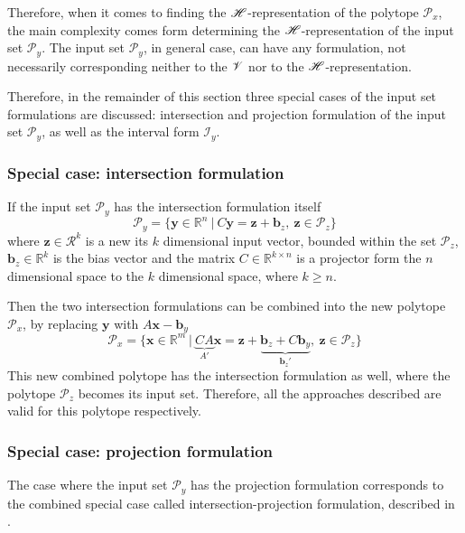 Therefore, when it comes to finding the $\mathscr{H}$-representation of the polytope $\mathcal{P}_x$, the main complexity comes form determining the $\mathscr{H}$-representation of the input set $\mathcal{P}_y$. The input set $\mathcal{P}_y$, in general case, can have any formulation, not necessarily corresponding neither to the $\mathscr{V}$ nor to the $\mathscr{H}$-representation.

Therefore, in the remainder of this section three special cases of the input set formulations are discussed: intersection and projection formulation of the input set $\mathcal{P}_y$, as well as the interval form $\mathcal{I}_y$.

\subsubsection*{Special case: intersection formulation} 
\label{ch:inter_h_special_inter}
If the input set $\mathcal{P}_y$ has the intersection formulation itself
\begin{equation}
    \mathcal{P}_y=\{\bm{y}\in  \mathbb{R}^n~|~ C\bm{y}=\bm{z} + \bm{b}_z, ~ \bm{z} \in \mathcal{P}_z \}
\end{equation}
where $\bm{z}\in\mathcal{R}^k$ is a new its $k$ dimensional input vector, bounded within the set $\mathcal{P}_z$, $\bm{b}_z\in\mathbb{R}^k$ is the bias vector and the matrix $C\in \mathbb{R}^{k\times n}$ is a projector form the $n$ dimensional space to the $k$ dimensional space, where $k\geq n$.

Then the two intersection formulations can be combined into the new polytope $\mathcal{P}_x$, by replacing $\bm{y}$ with $A\bm{x}- \bm{b}_y$
\begin{equation}
    \mathcal{P}_x=\{\bm{x}\in  \mathbb{R}^m~|~ \underbrace{CA}_{A'}\bm{x}=\bm{z} + \underbrace{\bm{b}_z + C\bm{b}_y}_{\bm{b}_z'}, ~ \bm{z} \in \mathcal{P}_z \}
\end{equation}
This new combined polytope has the intersection formulation as well, where the polytope $\mathcal{P}_z$ becomes its input set. Therefore, all the approaches described  are valid for this polytope respectively.

\subsubsection*{Special case: projection formulation} 
The case where the input set $\mathcal{P}_y$ has the projection formulation corresponds to the combined special case called intersection-projection formulation, described in . 

